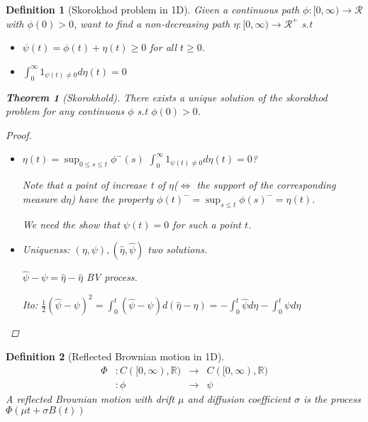 \documentclass{article} \usepackage[utf8]{inputenc}
\newtheorem{theorem}{Theorem}
\newtheorem{definition}{Definition}
\begin{document}
  \begin{definition}[Skorokhod problem in 1D]
    Given a continuous path $\phi: [0, \infty) \rightarrow \mathcal{R}$ with $\phi(0) > 0$, want to find a non-decreasing path
    $\eta: [0, \infty)\rightarrow \mathcal{R}^+$ s.t
    \begin{itemize}
    \item $\psi(t) = \phi(t) + \eta(t) \ge 0$ for all $t \ge 0$.
    \item $\int_0^{\infty} 1_{\psi(t) \ne 0} d\eta(t)= 0$
    \end{itemize}

    \begin{theorem}[Skorokhold]
      There exists a unique solution of the skorokhod problem for any continuous $\phi$ s.t $\phi(0) > 0$.
    \end{theorem}
    \begin{proof}
      \begin{itemize}
      \item $\eta(t) = \sup_{0 \le s \le t} \phi^-(s)$
        $\int_0^{\infty} 1_{\psi(t) \ne 0} d\eta(t) = 0$?

        Note that a point of increase t of $\eta$($\iff$ the support of the corresponding measure $d\eta$) have the property
        $\phi(t)^- = \sup_{s \le t} \phi(s)^- = \eta(t)$.
        
        We need the show that $\psi(t) = 0$ for such a point $t$.
        
      \item Uniquenss: $(\eta, \psi), (\hat \eta, \hat \psi)$ two solutions.
        
        $\hat \psi - \psi = \hat \eta - \hat \eta$ BV process.

        Ito: $\frac12 (\hat \psi - \psi)^2 = \int_0^t (\hat \psi - \psi)d(\hat \eta - \eta) =
        - \int_0^t \hat \psi d\eta - \int_0^t  \psi d \hat \eta$
      \end{itemize}
    \end{proof}
  \end{definition}
  \begin{definition}[Reflected Brownian motion in 1D]
    \begin{align*}
      \Phi & : C([0, \infty), \mathbb R) &\longrightarrow &C([0, \infty), \mathbb R)\\
           & : \phi &\longrightarrow & \psi 
    \end{align*}
    A reflected Brownian motion with drift $\mu$ and diffusion coefficient $\sigma$ is the process $\Phi(\mu t + \sigma B(t))$
  \end{definition}
\end{document}
